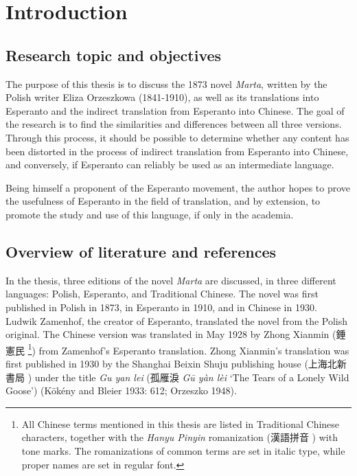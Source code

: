 \chapter{Introduction}

\section{Research topic and objectives}
The purpose of this thesis is to discuss the 1873 novel \textit{Marta}, written by the Polish writer Eliza Orzeszkowa (1841-1910), as well as its translations into Esperanto and the indirect translation from Esperanto into Chinese.
The goal of the research is to find the similarities and differences between all three versions. %
Through this process, it should be possible to determine whether any content has been distorted in the process of indirect translation from Esperanto into Chinese, and conversely, if Esperanto can reliably be used as an intermediate language.

Being himself a proponent of the Esperanto movement, the author hopes to prove the usefulness of Esperanto in the field of translation, and by extension, to promote the study and use of this language, if only in the academia.

\section{Overview of literature and references}
In the thesis, three editions of the novel \textit{Marta} are discussed, in three different languages: Polish, Esperanto, and Traditional Chinese.
The novel was first published in Polish in 1873, in Esperanto in 1910, and in Chinese in 1930.
Ludwik Zamenhof, the creator of Esperanto, %
translated the novel from the Polish original.
The Chinese version was translated in May 1928 by Zhong Xianmin (錘憲民 %
\footnote{All Chinese terms mentioned in this thesis are listed in Traditional Chinese characters, together with the \textit{Hanyu Pinyin} romanization (漢語拼音 ) with tone marks. The romanizations of common terms are set in italic type, while proper names are set in regular font.}) %
from Zamenhof's Esperanto translation.
Zhong Xianmin's translation was first published in 1930 by the Shanghai Beixin Shuju publishing house (上海北新書局 ) under the title \textit{Gu yan lei} (孤雁淚 \textit{Gū yàn lèi} `The Tears of a Lonely Wild Goose')
(Kökény and Bleier 1933: 612; Orzeszko 1948).


